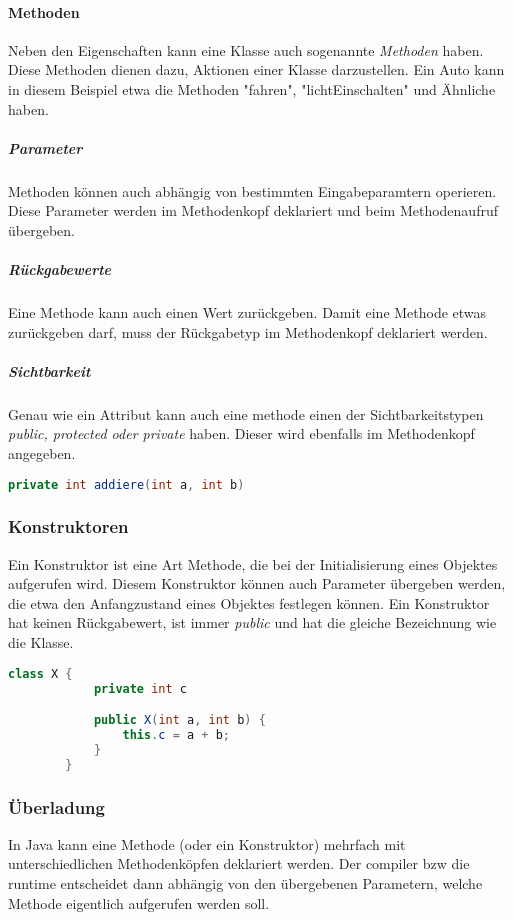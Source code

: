 \documentclass{article}
\begin{document}
	\paragraph{Methoden}
	Neben den Eigenschaften kann eine Klasse auch sogenannte \textit{Methoden} haben. Diese Methoden dienen dazu, Aktionen einer Klasse darzustellen. Ein Auto kann in diesem Beispiel etwa die Methoden "fahren", "lichtEinschalten" und Ähnliche haben.

	\subparagraph{Parameter}
	Methoden können auch abhängig von bestimmten Eingabeparamtern operieren. Diese Parameter werden im Methodenkopf deklariert und beim Methodenaufruf übergeben.

	\subparagraph{Rückgabewerte}
	Eine Methode kann auch einen Wert zurückgeben. Damit eine Methode etwas zurückgeben darf, muss der Rückgabetyp im Methodenkopf deklariert werden.

	\subparagraph{Sichtbarkeit}
	Genau wie ein Attribut kann auch eine methode einen der Sichtbarkeitstypen \textit{public, protected oder private} haben. Dieser wird ebenfalls im Methodenkopf angegeben.

	\begin{lstlisting}[language=Java, caption=Ein Beispiel für einen Methodenkopf]
		private int addiere(int a, int b) 
	\end{lstlisting}

	\subsubsection{Konstruktoren}
	Ein Konstruktor ist eine Art Methode, die bei der Initialisierung eines Objektes aufgerufen wird. Diesem Konstruktor können auch Parameter übergeben werden, die etwa den Anfangzustand eines Objektes festlegen können. Ein Konstruktor hat keinen Rückgabewert, ist immer \textit{public} und hat die gleiche Bezeichnung wie die Klasse.

	\begin{lstlisting}[language=Java, caption=Ein Beispiel für eine Klasse mit Konstruktor]
		class X {
			private int c

			public X(int a, int b) {
				this.c = a + b;
			}
		}
	\end{lstlisting}

	\subsubsection{Überladung}
	In Java kann eine Methode (oder ein Konstruktor) mehrfach mit unterschiedlichen Methodenköpfen deklariert werden. Der compiler bzw die runtime entscheidet dann abhängig von den übergebenen Parametern, welche Methode eigentlich aufgerufen werden soll.
\end{document}
